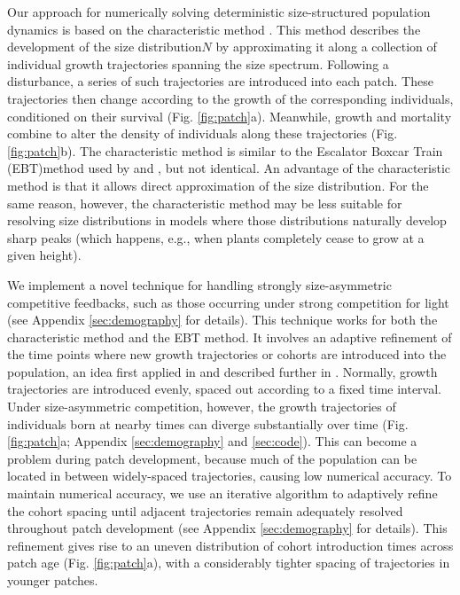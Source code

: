 \documentclass[a4paper,11pt]{article}
\begin{document}
Our approach for numerically solving deterministic size-structured population dynamics is
based on the characteristic method \citep{Angulo-2004}. This method describes the development of
the size distribution\(N\) by approximating it along a collection of individual growth trajectories spanning the size
spectrum. Following a disturbance, a series of such trajectories are introduced
into each patch. These trajectories then change according to the growth
of the corresponding individuals, conditioned on their survival
(Fig. \ref{fig:patch}a). Meanwhile, growth and mortality combine
to alter the density of individuals along these trajectories
(Fig. \ref{fig:patch}b). The characteristic method is similar to the Escalator Boxcar Train (\textsc{EBT})method
\citep{Deroos-1988, Deroos-1997} used by \citet{Falster-2011} and
\citet{Falster-2015}, but not identical. An advantage of the characteristic method is that it allows direct approximation of the size distribution. For the same reason, however, the characteristic method may be less suitable for resolving size distributions in models where those distributions naturally develop sharp peaks (which happens, e.g., when plants completely cease to grow at a given height).

We implement a novel technique for
handling strongly size-asymmetric competitive feedbacks, such as those occurring
under strong competition for light (see Appendix \ref{sec:demography}
for details). This technique works for both the characteristic method and the \textsc{EBT} method. It involves an
adaptive refinement of the time points where new growth trajectories or cohorts are introduced
into the population, an idea first applied in \citet{Falster-2011} and
described further in \citet{Falster-2015}.
Normally, growth trajectories are introduced evenly, spaced out according to a fixed time
interval. Under size-asymmetric competition, however, the growth
trajectories of individuals born at nearby times can diverge
substantially over time (Fig. \ref{fig:patch}a; Appendix
\ref{sec:demography} and \ref{sec:code}). This can become a problem during patch
development, because much of the population can be located in between
widely-spaced trajectories, causing low numerical accuracy. To maintain
numerical accuracy, we use an iterative algorithm to adaptively refine
the cohort spacing until adjacent trajectories remain
adequately resolved throughout patch development (see Appendix
\ref{sec:demography} for details). This refinement gives rise to an uneven
distribution of cohort introduction times across patch age (Fig.
\ref{fig:patch}a), with a considerably tighter spacing of trajectories in
younger patches.
\end{document}
